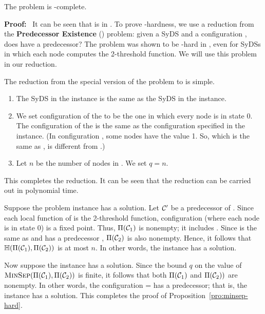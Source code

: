 \begin{proposition}\label{pro:minsep-hard}
The \mps{} problem is \cnp-complete.
\end{proposition}

\noindent
\textbf{Proof:}~ It can be seen that \mps{} is in \cnp.
To prove \cnp-hardness,
we use a reduction from the 
\textbf{Predecessor Existence} (\pre) problem: given a SyDS \cals{} and
a configuration \calc, does \calc{} have a predecessor?
The \pre{} problem was shown to be \cnp-hard in \cite{BH+07},
even for SyDSs in which each node computes the 2-threshold function.
We will use this problem in our reduction.

\smallskip

\noindent
The reduction from the special version of the \pre{} problem to \mps{}
is simple.
\begin{enumerate}
\item The SyDS \cals{} in the \mps{} instance is the same as the SyDS in the
\pre{} instance.
\item We set configuration \calcone{} of the \mps{} to be the one in which
every node is in state 0.
The configuration \calctwo{} of the \mps{} is the same as the configuration
\calc{} specified in the \pre{} instance.
(In configuration \calc, some nodes have the value 1. So,
\calc{} which is the same as \calctwo, is different from \calcone.)
\item Let $n$ be the number of nodes in \cals. We set $q = n$.
\end{enumerate}
This completes the reduction. It can be seen that the reduction
can be carried out in polynomial time.

Suppose the \pre{} problem instance has a solution.
Let $\mbox{$\mathcal{C'}$}$ be a predecessor of \calc.
Since each local function of \cals{} is the 2-threshold function,
configuration \calcone{} (where each node is in state 0) is a fixed point.
Thus, $\Pi(\mbox{$\mathcal{C}_{1}$})$ is nonempty; it includes \calcone.
Since \calctwo{} is the same as \calc{} and \calc{} has a
predecessor \calcp,  $\Pi(\mbox{$\mathcal{C}_{2}$})$ is also nonempty. 
Hence, it follows that $\mbox{$\mathbb{H}$}(\Pi(\mbox{$\mathcal{C}_{1}$}), \Pi(\mbox{$\mathcal{C}_{2}$}))$ is at most $n$.
In other words, the \mps{} instance has a solution.

Now suppose the \mps{} instance has a solution.
Since the bound $q$ on the value of 
$\mbox{\textsc{MinSep}}(\Pi(\mbox{$\mathcal{C}_{1}$}), \Pi(\mbox{$\mathcal{C}_{2}$}))$ is finite, 
it follows that both 
$\Pi(\mbox{$\mathcal{C}_{1}$})$ and $\Pi(\mbox{$\mathcal{C}_{2}$}))$ are nonempty. 
In other words, the configuration \calctwo{} = \calc{}
has a predecessor; that is, the \pre{} instance has a solution.
This completes the proof of Proposition~\ref{pro:minsep-hard}. 
\QED

